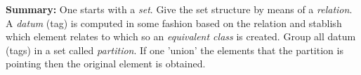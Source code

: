 \documentclass[12pt]{article}
\begin{document}
	\vspace{1cm}
	\noindent\textbf{Summary:}
	\noindent One starts with a \textit{set}. Give the set structure by means of a \textit{relation}. A \textit{datum} (tag) is computed in some fashion based on the relation and stablish which element relates to which so an \textit{equivalent class} is created. Group all datum (tags) in a set called \textit{partition}. If one 'union' the elements that the partition is pointing then the original element is obtained. 
	
\end{document}
